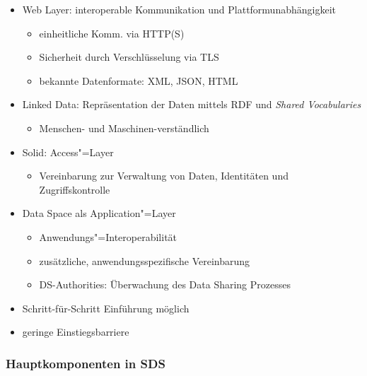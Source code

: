 \begin{itemize}
    \item Web Layer: interoperable Kommunikation und Plattformunabhängigkeit
    \begin{itemize}
        \item einheitliche Komm. via HTTP(S)
        \item Sicherheit durch Verschlüsselung via TLS
        \item bekannte Datenformate: XML, JSON, HTML
    \end{itemize}
    
    \item Linked Data: Repräsentation der Daten mittels RDF und \emph{Shared Vocabularies}
    \begin{itemize}
        \item Menschen- und Maschinen-verständlich
    \end{itemize}

    \item Solid: Access"=Layer
    \begin{itemize}
        \item Vereinbarung zur Verwaltung von Daten, Identitäten und Zugriffskontrolle
    \end{itemize}

    \item Data Space als Application"=Layer
    \begin{itemize}
        \item Anwendungs"=Interoperabilität
        \item zusätzliche, anwendungsspezifische Vereinbarung
        \item DS-Authorities: Überwachung des Data Sharing Prozesses~\cite{mecklerWebLinkedData2023}
    \end{itemize}
\end{itemize}

\vspace{1cm}

\begin{itemize}
    \item Schritt-für-Schritt Einführung möglich
    \item geringe Einstiegsbarriere~\cite{mecklerWebLinkedData2023}
\end{itemize}


\subsubsection{Hauptkomponenten in SDS}

